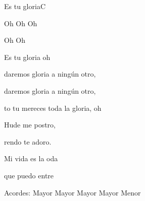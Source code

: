 \documentclass[12pt, spanish]{book}
\begin{document}
\begin{song}{Es tu gloria}{C}
\begin{SBChorus}
             Oh    Oh     Oh    


             Oh    Oh         

            Es tu gloria oh 
        \end{SBChorus}

        \begin{SBOpGroup}
             daremos gloria a ningún otro,

             daremos gloria a ningún otro,

            to tu mereces toda la gloria, oh 
        \end{SBOpGroup}
        \vskip 20pt
        \begin{SBOpGroup}
            Hude me postro,

            rendo te adoro.

            Mi vida es la oda

            que puedo entre
        \end{SBOpGroup}

        \ifChordBk
        \begin{SBOpGroup}
            Acordes:\break
             Mayor \hfill
             Mayor \hfill\null\break
             Mayor \hfill
             Mayor \hfill
             Menor \hfill\null\break
        \end{SBOpGroup}
        \fi
    \end{song}
\end{document}
